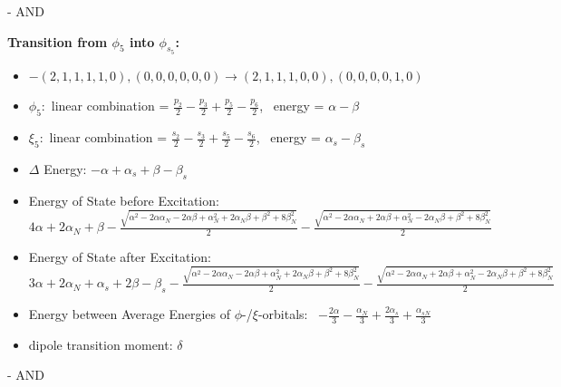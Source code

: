 \documentclass[12pt,a4paper]{article}
\begin{document}
\begin{itemize}
        \end{itemize}
        
 -  AND 

        \noindent\textbf{Transition from $\phi_{5}$ into $\phi_{s_{5}}$:}
        \begin{itemize}
            \item $- (2, 1, 1, 1, 1, 0), (0, 0, 0, 0, 0, 0) \rightarrow (2, 1, 1, 1, 0, 0), (0, 0, 0, 0, 1, 0)$
        
            \item $\phi_{5}:$ linear combination = $\frac{p_{2}}{2} - \frac{p_{3}}{2} + \frac{p_{5}}{2} - \frac{p_{6}}{2}$, \
            energy = $\alpha - \beta$
            
            \item $\xi_{5}:$ linear combination = $\frac{s_{2}}{2} - \frac{s_{3}}{2} + \frac{s_{5}}{2} - \frac{s_{6}}{2}$, \
            energy = $\alpha_{s} - \beta_{s}$
            
            \item $\Delta$ Energy: $- \alpha + \alpha_{s} + \beta - \beta_{s}$
            \item Energy of State before Excitation: $4 \alpha + 2 \alpha_{N} + \beta - \frac{\sqrt{\alpha^{2} - 2 \alpha \alpha_{N} - 2 \alpha \beta + \alpha_{N}^{2} + 2 \alpha_{N} \beta + \beta^{2} + 8 \beta_{N}^{2}}}{2} - \frac{\sqrt{\alpha^{2} - 2 \alpha \alpha_{N} + 2 \alpha \beta + \alpha_{N}^{2} - 2 \alpha_{N} \beta + \beta^{2} + 8 \beta_{N}^{2}}}{2}$
            \item Energy of State after Excitation: $3 \alpha + 2 \alpha_{N} + \alpha_{s} + 2 \beta - \beta_{s} - \frac{\sqrt{\alpha^{2} - 2 \alpha \alpha_{N} - 2 \alpha \beta + \alpha_{N}^{2} + 2 \alpha_{N} \beta + \beta^{2} + 8 \beta_{N}^{2}}}{2} - \frac{\sqrt{\alpha^{2} - 2 \alpha \alpha_{N} + 2 \alpha \beta + \alpha_{N}^{2} - 2 \alpha_{N} \beta + \beta^{2} + 8 \beta_{N}^{2}}}{2}$
            \item Energy between Average Energies of $\phi$-/$\xi$-orbitals: \
            $- \frac{2 \alpha}{3} - \frac{\alpha_{N}}{3} + \frac{2 \alpha_{s}}{3} + \frac{\alpha_{s N}}{3}$
        
            \item dipole transition moment: $\delta$
        
        \end{itemize}
        
 -  AND 
\end{document}
